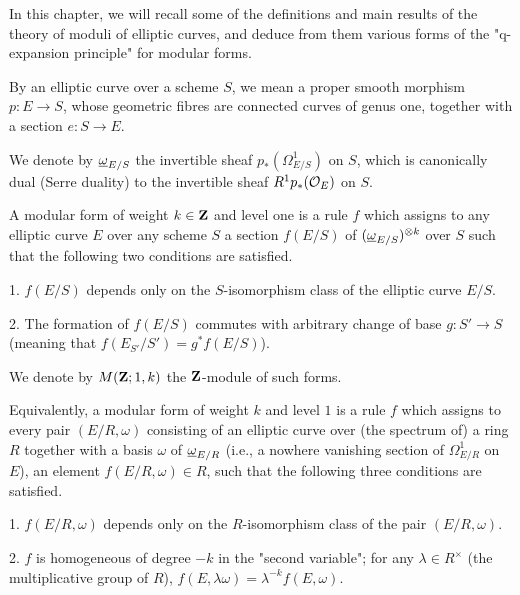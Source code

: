 
In this chapter, we will recall some of the definitions and main results of the
theory of moduli of elliptic curves, and deduce from them various forms of the
"q-expansion principle" for modular forms.

 By an elliptic curve over a scheme $S$, we mean a proper smooth
morphism $p\colon E\to S$, whose geometric fibres are connected curves of genus
one, together with a section $e\colon S\to E$.

\begin{center}
\end{center}

We denote by $\underline{\omega}_{E/S}$ the invertible sheaf $p_*(\Omega^1_{E/S})$ on $S$,
which is canonically dual (Serre duality) to the invertible sheaf
$R^1p_*(\mathcal{O}_E)$ on $S$.


A modular form of weight $k\in\mathbf{Z}$ and level one is a rule $f$ which assigns to
any elliptic curve $E$ over any scheme $S$ a section $f(E/S)$ of
$(\underline{\omega}_{E/S})^{\otimes k}$ over $S$ such that the following two conditions are
satisfied.

1. $f(E/S)$ depends only on the $S$-isomorphism class of the elliptic curve
$E/S$.

2. The formation of $f(E/S)$ commutes with arbitrary change of base
$g\colon S'\to S$ (meaning that $f(E_{S'}/S') = g^*f(E/S)$).

We denote by $M(\mathbf{Z};1,k)$ the $\mathbf{Z}$-module of such forms.

Equivalently, a modular form of weight $k$ and level $1$ is a rule $f$ which
assigns to every pair $(E/R,\omega)$ consisting of an elliptic curve over (the
spectrum of) a ring $R$ together with a basis $\omega$ of $\underline{\omega}_{E/R}$ (i.e., a
nowhere vanishing section of $\Omega^1_{E/R}$ on $E$), an element
$f(E/R,\omega)\in R$, such that the following three conditions are satisfied.

1. $f(E/R,\omega)$ depends only on the $R$-isomorphism class of the pair
$(E/R,\omega)$.

2. $f$ is homogeneous of degree $-k$ in the "second variable"; for any
$\lambda\in R^\times$ (the multiplicative group of $R$),
$f(E,\lambda\omega) = \lambda^{-k}f(E,\omega)$.

